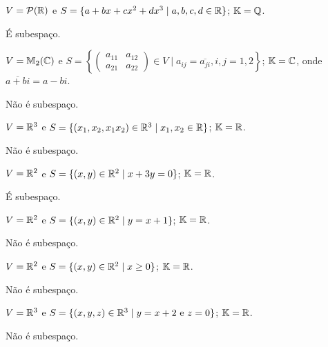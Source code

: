 \documentclass[12pt]{exam}
\begin{document}
\begin{exercicio}
    $V = \mathcal{P}(\mathbb{R})$ e $S = \{a + bx + cx^2 + dx^3\mid a, b, c, d \in \mathbb{R}\}$; $\mathbb{K} = \mathbb{Q}$.
    \begin{solucao}
      É subespaço.
    \end{solucao}
\end{exercicio}

\begin{exercicio}
  $V = \mathbb{M}_2(\mathbb{C})$ e $S = \left\{\begin{pmatrix} a_{11} & a_{12}\\ a_{21} & a_{22}\end{pmatrix} \in V \mid a_{ij} = \overline{a_{ji}}, i, j = 1, 2\right\}$; $\mathbb{K} = \mathbb{C}$, onde $\overline{a + bi} = a - bi$.
  \begin{solucao}
    Não é subespaço.
  \end{solucao}
\end{exercicio}

\begin{exercicio}
  $V = \mathbb{R}^3$ e $S = \{(x_1, x_2, x_1x_2) \in \mathbb{R}^3 \mid x_1, x_2 \in \mathbb{R}\}$; $\mathbb{K} = \mathbb{R}$.
  \begin{solucao}
    Não é subespaço.
  \end{solucao}
\end{exercicio}

\begin{exercicio}
  $V = \mathbb{R}^2$ e $S = \{(x, y) \in \mathbb{R}^2 \mid x + 3y = 0\}$; $\mathbb{K} = \mathbb{R}$.
  \begin{solucao}
    É subespaço.
  \end{solucao}
\end{exercicio}

\begin{exercicio}
  $V = \mathbb{R}^2$ e $S = \{(x, y) \in \mathbb{R}^2 \mid y = x + 1\}$; $\mathbb{K} = \mathbb{R}$.
  \begin{solucao}
    Não é subespaço.
  \end{solucao}
\end{exercicio}

\begin{exercicio}
  $V = \mathbb{R}^2$ e $S = \{(x, y) \in \mathbb{R}^2 \mid x \ge 0\}$; $\mathbb{K} = \mathbb{R}$.
  \begin{solucao}
    Não é subespaço.
  \end{solucao}
\end{exercicio}

\begin{exercicio}
  $V = \mathbb{R}^3$ e $S = \{(x, y, z) \in \mathbb{R}^3 \mid y = x + 2 \mbox{ e } z = 0\}$; $\mathbb{K} = \mathbb{R}$.
  \begin{solucao}
    Não é subespaço.
  \end{solucao}
\end{exercicio}
\end{document}
